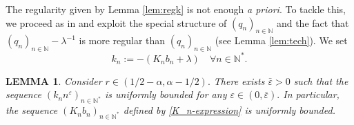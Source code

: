 \documentclass[11pt, dvipsnames]{amsart}
\newtheorem{lem}[theorem]{LEMMA}
\begin{document}
The regularity given by Lemma \ref{lem:regk} is not enough \emph{a priori}. To tackle this, we proceed as in \cite{Gagnon2022-fredholm} and exploit the special structure of $(q_{n})_{n\in\mathbb{N}}$ and the fact that $(q_{n})_{n\in\mathbb{N}}-\lambda^{-1}$ is more regular than $(q_{n})_{n\in\mathbb{N}}$ (see Lemma \ref{lem:tech}). We set 
 \begin{equation}
 \label{K_n-expression}
    k_n:=-(K_nb_n+\lambda)\quad \forall n\in \mathbb{N}^*.
\end{equation}


  \begin{lem}\label{Lemma-K_n}
Consider $r\in (1/2-\alpha,\alpha-1/2).$ There exists $\bar\varepsilon>0$ such that the sequence $(k_n n^{\varepsilon})_{n\in \mathbb{N}^*}$ is uniformly bounded for any $\varepsilon\in (0,\bar \varepsilon).$ In particular, the sequence $(K_n b_n)_{n\in \mathbb{N}^*}$ defined by \eqref{K_n-expression} is uniformly bounded.
  \end{lem}
 
\end{document}
